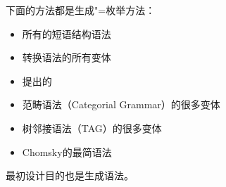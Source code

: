 下面的方法都是生成"=枚举方法：
\begin{itemize}
\item 所有的短语结构语法
\item 转换语法的所有变体
\item  \citet*{GKPS85a}提出的\gpsgc 
\item 范畴语法\indexcgc（Categorial Grammar）的很多变体
\item 树邻接语法\indextagc（TAG）的很多变体
\item Chomsky的最简语法
\end{itemize}
\lfg 最初设计目的也是生成语法。

